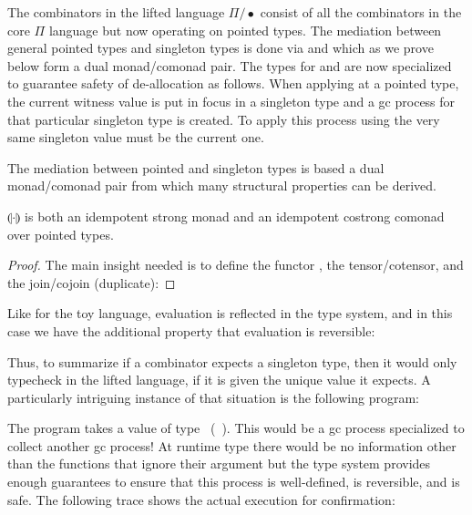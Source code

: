 \documentclass[sigplan,10pt,review,anonymous]{acmart}
\newcommand{\Afun}[1]{\AgdaFunction{#1}}
\newcommand{\Acon}[1]{\AgdaInductiveConstructor{#1}}
\newcommand{\Avar}[1]{\AgdaBound{#1}}
\begin{document}
The combinators in the lifted language $\Pi/\bullet$ consist of all the combinators
in the core $\Pi$ language but now operating on pointed types. The mediation
between general pointed types and singleton types is done via
\Acon{return} and \Acon{extract} which as we prove below form a
dual monad/comonad pair. The types for \Acon{$\eta$} and
\Acon{$\epsilon$} are now specialized to guarantee safety of
de-allocation as follows. When applying \Acon{$\eta$} at a pointed type, the
current witness value is put in focus in a singleton type and a gc
process for that particular singleton type is created. To apply this
process using \Acon{$\epsilon$} the very same singleton value must be
the current one.

\PIPFCombDef{}

The mediation between pointed and singleton types is based a dual
monad/comonad pair from which many structural properties can be
derived.

\begin{proposition}
  $\llparenthesis \cdot \rrparenthesis$ is both an idempotent strong
  monad and an idempotent costrong comonad over pointed types.
\end{proposition}
\begin{proof}
  The main insight needed is to define the functor \Afun{∙Singᵤ}, the
  tensor/cotensor, and the join/cojoin (duplicate):
\PIPFCombderive{}
\end{proof}

Like for the toy language, evaluation is reflected in the type
system, and in this case we have the additional property that
evaluation is reversible:

\PIPFeval{}

\vspace{-\baselineskip}

\PIPFrev{}

Thus, to summarize if a combinator expects a singleton type, then it
would only typecheck in the lifted language, if it is given the unique
value it expects. A particularly intriguing instance of that
situation is the following program:

\begin{center}

\end{center}

\PIPFrevrev{}

The program takes a value of type
\Acon{∙𝟙/}~(\Acon{∙𝟙/}~\Avar{A}). This would be a gc process
specialized to collect another gc process! At runtime type there would
be no information other than the functions that ignore their argument
but the type system provides enough guarantees to ensure that this
process is well-defined, is reversible, and is safe. The following
trace shows the actual execution for confirmation:
\end{document}
